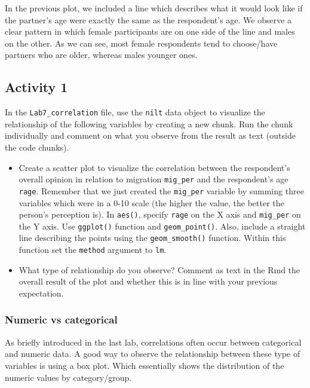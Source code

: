 \documentclass[
]{book}
\providecommand{\tightlist}{%
  \setlength{\itemsep}{0pt}\setlength{\parskip}{0pt}}
\begin{document}
In the previous plot, we included a line which describes what it would look like if the partner's age were exactly the same as the respondent's age. We observe a clear pattern in which female participants are on one side of the line and males on the other. As we can see, most female respondents tend to choose/have partners who are older, whereas males younger ones.

\hypertarget{activity-1-2}{%
\subsection{Activity 1}\label{activity-1-2}}

In the \texttt{Lab7\_correlation} file, use the \texttt{nilt} data object to visualize the relationship of the following variables by creating a new chunk. Run the chunk individually and comment on what you observe from the result as text (outside the code chunks).

\begin{itemize}
\tightlist
\item
  Create a scatter plot to visualize the correlation between the respondent's overall opinion in relation to migration \texttt{mig\_per} and the respondent's age \texttt{rage}. Remember that we just created the \texttt{mig\_per} variable by summing three variables which were in a 0-10 scale (the higher the value, the better the person's perception is). In \texttt{aes()}, specify \texttt{rage} on the X axis and \texttt{mig\_per} on the Y axis. Use \texttt{ggplot()} function and \texttt{geom\_point()}. Also, include a straight line describing the points using the \texttt{geom\_smooth()} function. Within this function set the \texttt{method} argument to \texttt{\textquotesingle{}lm\textquotesingle{}}.
\item
  What type of relationship do you observe? Comment as text in the Rmd the overall result of the plot and whether this is in line with your previous expectation.
\end{itemize}

\hypertarget{numeric-vs-categorical}{%
\subsubsection{Numeric vs categorical}\label{numeric-vs-categorical}}

As briefly introduced in the last lab, correlations often occur between categorical and numeric data. A good way to observe the relationship between these type of variables is using a box plot. Which essentially shows the distribution of the numeric values by category/group.
\end{document}
